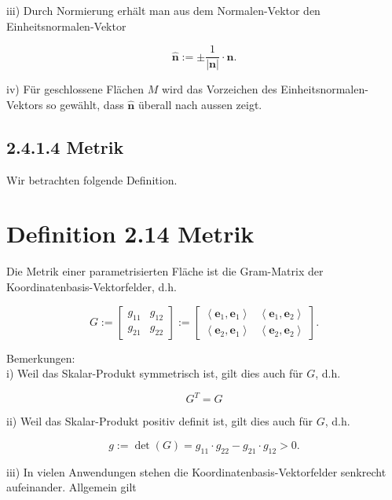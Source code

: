 \documentclass[10pt]{article}
\begin{document}
iii) Durch Normierung erhält man aus dem Normalen-Vektor den Einheitsnormalen-Vektor


\begin{equation*}
\hat{\mathbf{n}}:= \pm \frac{1}{|\mathbf{n}|} \cdot \mathbf{n} . \tag{2.103}
\end{equation*}


iv) Für geschlossene Flächen $M$ wird das Vorzeichen des Einheitsnormalen-Vektors so gewählt, dass $\hat{\mathbf{n}}$ überall nach aussen zeigt.

\subsection*{2.4.1.4 Metrik}
Wir betrachten folgende Definition.

\section*{Definition 2.14 Metrik}
Die Metrik einer parametrisierten Fläche ist die Gram-Matrix der Koordinatenbasis-Vektorfelder, d.h.

\[
G:=\left[\begin{array}{ll}
g_{11} & g_{12}  \tag{2.104}\\
g_{21} & g_{22}
\end{array}\right]:=\left[\begin{array}{ll}
\left\langle\mathbf{e}_{1}, \mathbf{e}_{1}\right\rangle & \left\langle\mathbf{e}_{1}, \mathbf{e}_{2}\right\rangle \\
\left\langle\mathbf{e}_{2}, \mathbf{e}_{1}\right\rangle & \left\langle\mathbf{e}_{2}, \mathbf{e}_{2}\right\rangle
\end{array}\right] .
\]

Bemerkungen:\\
i) Weil das Skalar-Produkt symmetrisch ist, gilt dies auch für $G$, d.h.


\begin{equation*}
G^{T}=G \tag{2.105}
\end{equation*}


ii) Weil das Skalar-Produkt positiv definit ist, gilt dies auch für $G$, d.h.


\begin{equation*}
g:=\operatorname{det}(G)=g_{11} \cdot g_{22}-g_{21} \cdot g_{12}>0 . \tag{2.106}
\end{equation*}


iii) In vielen Anwendungen stehen die Koordinatenbasis-Vektorfelder senkrecht aufeinander. Allgemein gilt
\end{document}
